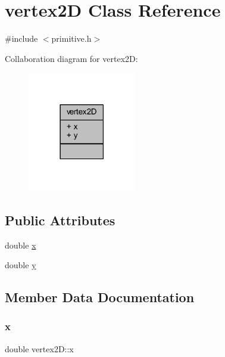 \hypertarget{classvertex2_d}{}\section{vertex2D Class Reference}
\label{classvertex2_d}


{\ttfamily \#include $<$primitive.\+h$>$}



Collaboration diagram for vertex2D\+:
\nopagebreak
\begin{figure}[H]
\begin{center}
\leavevmode
\includegraphics[width=134pt]{classvertex2_d__coll__graph}
\end{center}
\end{figure}
\subsection*{Public Attributes}
\begin{DoxyCompactItemize}
\item 
double \mbox{\hyperlink{classvertex2_d_a0022f681a4ded8ba4c741b461a6944eb}{x}}
\item 
double \mbox{\hyperlink{classvertex2_d_aaa0010f8b85b5837db64ef78f8151afe}{y}}
\end{DoxyCompactItemize}


\subsection{Member Data Documentation}
\mbox{\label{classvertex2_d_a0022f681a4ded8ba4c741b461a6944eb}} 
\subsubsection{\texorpdfstring{x}{x}}
{\footnotesize\ttfamily double vertex2\+D\+::x}

